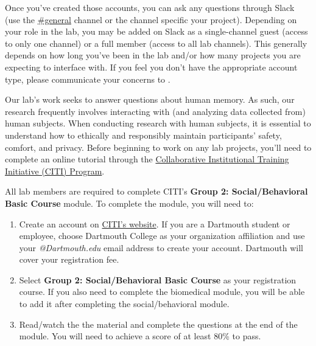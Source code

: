 \documentclass{tufte-book} %
\begin{document}
Once you've created those accounts, you can ask any questions through
Slack (use the
\href{https://context-lab.slack.com/messages/general/}{\#general}
  channel or the channel specific your project).  Depending on your
role in the lab, you may be added on Slack as a single-channel guest
(access to only one channel) or a full member (access to all lab
channels).  This generally depends on how long you've been in the lab
and/or how many projects you are expecting to interface with.  If you
feel you don't have the appropriate account type, please communicate
your concerns to \director.


\noindent Our lab's work seeks to answer questions about human memory.  As such,
our research frequently involves interacting with (and analyzing data collected from)
human subjects.  When conducting research with human subjects, it is essential
to understand how to ethically and responsibly maintain participants' safety,
comfort, and privacy.  Before beginning to work on any lab projects, you'll
need to complete an online tutorial through the \href{https://about.citiprogram.org}
{Collaborative Institutional Training Initiative (CITI) Program}.

\noindent All lab members are required to complete CITI's \textbf{Group 2: Social/Behavioral 
Basic Course} module.  To complete the module, you will need to:
\begin{enumerate}
\item Create an account on \href{https://about.citiprogram.org}{CITI's website}.
    If you are a Dartmouth student or employee, choose Dartmouth College as your
    organization affiliation and use your \textit{@Dartmouth.edu} email address to create
    your account.  Dartmouth will cover your registration fee.
\item Select \textbf{Group 2: Social/Behavioral Basic Course} as your registration course.
    If you also need to complete the biomedical module, you will be able to add it
    after completing the social/behavioral module.
\item Read/watch the the material and complete the questions at the end of
    the module.  You will need to achieve a score of at least 80\% to pass.
\end{enumerate}
\end{document}
